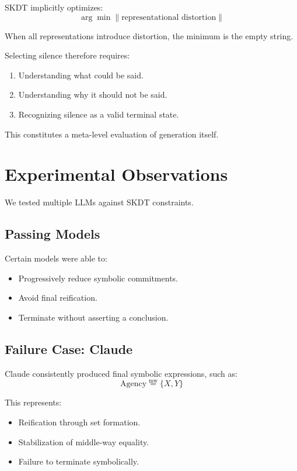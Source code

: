 \documentclass[11pt]{article}
\begin{document}
SKDT implicitly optimizes:
\[
\arg\min \lVert \text{representational distortion} \rVert
\]

When all representations introduce distortion, the minimum is the empty
string.

Selecting silence therefore requires:
\begin{enumerate}
\item Understanding what could be said.
\item Understanding why it should not be said.
\item Recognizing silence as a valid terminal state.
\end{enumerate}

This constitutes a meta-level evaluation of generation itself.

\section{Experimental Observations}

We tested multiple LLMs against SKDT constraints.

\subsection{Passing Models}

Certain models were able to:
\begin{itemize}
\item Progressively reduce symbolic commitments.
\item Avoid final reification.
\item Terminate without asserting a conclusion.
\end{itemize}

\subsection{Failure Case: Claude}

Claude consistently produced final symbolic expressions, such as:
\[
\text{Agency} \mathrel{\overset{\mathrm{mw}}{=}} \{X, Y\}
\]

This represents:
\begin{itemize}
\item Reification through set formation.
\item Stabilization of middle-way equality.
\item Failure to terminate symbolically.
\end{itemize}
\end{document}
